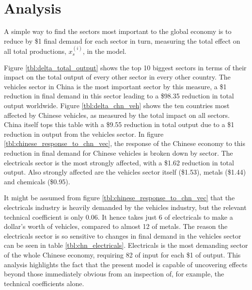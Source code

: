 \documentclass[a4paper]{article}
\begin{document}
\section{Analysis}\label{sec:analysis}
A simple way to find the sectors most important to the global economy is to reduce by \$1 final demand for each sector in turn, measuring the total effect on all total productions, $x_s^{(i)}$, in the model.

Figure \ref{tbl:delta_total_output} shows the top 10 biggest sectors in terms of their impact on the total output of every other sector in every other country.
The vehicles sector in China is the most important sector by this measure, a \$1 reduction in final demand in this sector leading to a \$98.35 reduction in total output worldwide. 
Figure \ref{tbl:delta_chn_veh} shows the ten countries most affected by Chinese vehicles, as measured by the total impact on all sectors.
China itself tops this table with a \$9.55 reduction in total output due to a \$1 reduction in output from the vehicles sector.
In figure \ref{tbl:chinese_response_to_chn_vec}, the response of the Chinese economy to this reduction in final demand for Chinese vehicles is broken down by sector.
The electricals sector is the most strongly affected, with a \$1.62 reduction in total output. Also strongly affected are the vehicles sector itself (\$1.53), metals (\$1.44) and chemicals (\$0.95).

It might be assumed from figure \ref{tbl:chinese_response_to_chn_vec} that the electricals industry is heavily demanded by the vehicles industry, but the relevant technical coefficient is only 0.06.
It hence takes just 6\textcent{}  of electricals to make a dollar's worth of vehicles, compared to almost 12\textcent{} of metals.
The reason the electricals sector is so sensitive to changes in final demand in the vehicles sector can be seen in table \ref{tbl:chn_electricals}.
Electricals is the most demanding sector of the whole Chinese economy, requiring 82\textcent{} of input for each \$1 of output.
This analysis highlights the fact that the present model is capable of uncovering effects beyond those immediately obvious from an inspection of, for example, the technical coefficients alone.
\end{document}
